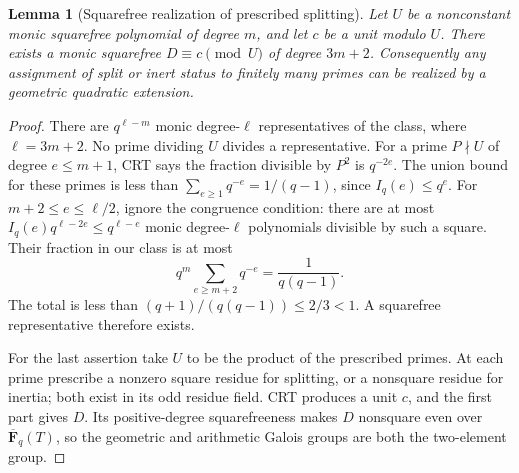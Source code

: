 \documentclass[11pt]{article}
\newtheorem{lemma}[theorem]{Lemma}
\newcommand{\F}{\mathbf F}
\begin{document}
\begin{lemma}[Squarefree realization of prescribed splitting]
\label{lem:splittingPrescription}
Let \(U\) be a nonconstant monic squarefree polynomial of degree \(m\),
and let \(c\) be a unit modulo \(U\). There exists a monic squarefree
\(D\equiv c\pmod U\) of degree \(3m+2\).
Consequently any assignment of split or inert status to finitely many
primes can be realized by a geometric quadratic extension.
\end{lemma}
\begin{proof}
There are \(q^{\ell-m}\) monic degree-\(\ell\) representatives of the
class, where \(\ell=3m+2\). No prime dividing \(U\) divides a representative.
For a prime \(P\nmid U\) of degree \(e\leq m+1\), CRT says the fraction
divisible by \(P^2\) is \(q^{-2e}\). The union bound for these primes is
less than
\(\sum_{e\geq1}q^{-e}=1/(q-1)\), since \(I_q(e)\leq q^e\).
For \(m+2\leq e\leq\ell/2\), ignore the congruence condition:
there are at most \(I_q(e)q^{\ell-2e}\leq q^{\ell-e}\)
monic degree-\(\ell\) polynomials divisible by such a square.
Their fraction in our class is at most
\[
 q^m\sum_{e\geq m+2}q^{-e}=\frac1{q(q-1)}.
\]
The total is less than
\((q+1)/(q(q-1))\leq2/3<1\). A squarefree representative therefore exists.

For the last assertion take \(U\) to be the product of the prescribed
primes. At each prime prescribe a nonzero square residue for splitting,
or a nonsquare residue for inertia; both exist in its odd residue field.
CRT produces a unit \(c\), and the first part gives \(D\).
Its positive-degree squarefreeness makes \(D\) nonsquare even over
\(\overline{\F}_q(T)\), so the geometric and arithmetic Galois groups
are both the two-element group.
\end{proof}
\end{document}
